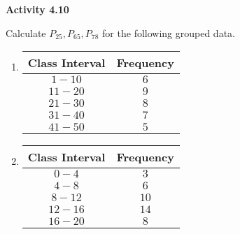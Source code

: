 \vspace{0.3ex}
\noindent\textbf{Activity 4.10}

\vspace{0.2ex}

Calculate \(P_{25}, P_{65}, P_{78}\) for the following grouped data.  
\begin{multicols}{2}
\begin{enumerate}
    \item 
    \begin{tabular}{|c|c|}
        \hline
        Class Interval & Frequency \\ \hline
        \(1 - 10\) & \(6\) \\ \hline
        \(11 - 20\) & \(9\) \\ \hline
        \(21 - 30\) & \(8\) \\ \hline
        \(31 - 40\) & \(7\) \\ \hline
        \(41 - 50\) & \(5\) \\ \hline
    \end{tabular}
    \item 
    \begin{tabular}{|c|c|}
        \hline
        Class Interval & Frequency \\ \hline
        \(0 - 4\) & \(3\) \\ \hline
        \(4 - 8\) & \(6\) \\ \hline
        \(8 - 12\) & \(10\) \\ \hline
        \(12 - 16\) & \(14\) \\ \hline
        \(16 - 20\) & \(8\) \\ \hline
    \end{tabular}
    \end{enumerate}
 \end{multicols}
